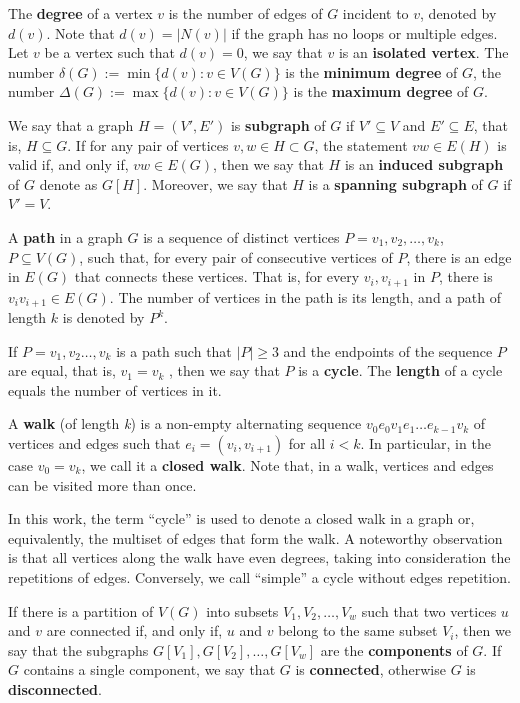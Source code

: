 The \textbf{degree} of a vertex \(v\) is the number of edges of \(G\) incident to \(v\), denoted by \(d(v)\). Note that \(d(v) = |N(v)|\) if the graph has no loops or multiple edges. Let \(v\) be a vertex such that \(d(v) = 0\), we say that \(v\) is an \textbf{isolated vertex}. The number \(\delta(G) := \min \{d(v) \colon v \in V(G)\}\) is the \textbf{minimum degree} of \(G\), the number \(\Delta(G) := \max \{d(v) \colon v \in V(G)\}\) is the \textbf{maximum degree} of \(G\).

We say that a graph \(H = (V' , E')\) is \textbf{subgraph} of \(G\) if \(V' \subseteq V\) and \(E' \subseteq E\), that is, \(H \subseteq G\). If for any pair of vertices \(v, w \in H \subset G\), the statement \(vw \in E(H)\) is valid if, and only if, \(vw \in E(G)\), then we say that \(H\) is an \textbf{induced subgraph} of \(G\) denote as \(G[H]\). Moreover, we say that \(H\) is a \textbf{spanning subgraph} of \(G\) if \(V' = V\).

A \textbf{path} in a graph \(G\) is a sequence of distinct vertices \(P = v_1, v_2, \dots, v_k\), \(P \subseteq V(G)\), such that, for every pair of consecutive vertices of \(P\), there is an edge in \(E(G)\) that connects these vertices. That is, for every \(v_i , v_{i+1}\) in \(P\), there is \(v_i v _{i+1} \in E(G)\). The number of vertices in the path is its length, and a path of length \(k\) is denoted by \(P^k\).

If \(P = v_1, v_2 \dots, v_k\) is a path such that \(|P| \geq 3\) and the endpoints of the sequence \(P\) are equal, that is, \(v_1 = v_k\) , then we say that \(P\) is a \textbf{cycle}. The \textbf{length} of a cycle equals the number of vertices in it. 

A \textbf{walk} (of length \textit{k}) is a non-empty alternating sequence \(v_0 e_0 v_1 e_1 \dots e_{k-1} v_k\) of vertices and edges such that \(e_i = (v_i, v_{i+1})\) for all \(i < k\). In particular, in the case \(v_0 = v_k\), we call it a \textbf{closed walk}. Note that, in a walk, vertices and edges can be visited more than once.

In this work, the term ``cycle'' is used to denote a closed walk in a graph or, equivalently, the multiset of edges that form the walk. A noteworthy observation is that all vertices along the walk have even degrees, taking into consideration the repetitions of edges. Conversely, we call ``simple'' a cycle without edges repetition.

If there is a partition of \(V(G)\) into subsets \(V_1 , V_2 , \dots, V_w\) such that two vertices \(u\) and \(v\) are connected if, and only if, \(u\) and \(v\) belong to the same subset \(V_i\), then we say that the subgraphs \(G[V_1], G[V_2], \dots, G[V_w]\) are the \textbf{components} of \(G\). If \(G\) contains a single component, we say that \(G\) is \textbf{connected}, otherwise \(G\) is \textbf{disconnected}.

